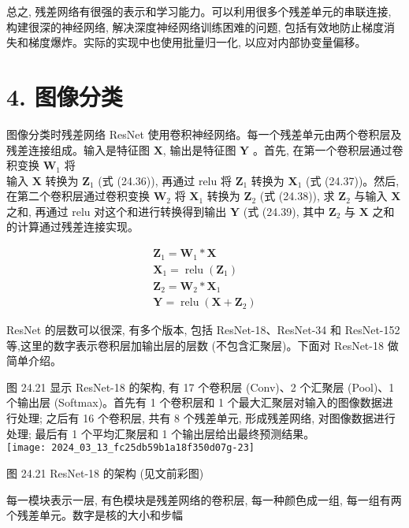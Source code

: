 \documentclass[10pt]{article}
\begin{document}
总之, 残差网络有很强的表示和学习能力。可以利用很多个残差单元的串联连接, 构建很深的神经网络, 解决深度神经网络训练困难的问题, 包括有效地防止梯度消失和梯度爆炸。实际的实现中也使用批量归一化, 以应对内部协变量偏移。

\section*{4. 图像分类}
图像分类时残差网络 ResNet 使用卷积神经网络。每一个残差单元由两个卷积层及残差连接组成。输入是特征图 $\boldsymbol{X}$, 输出是特征图 $\boldsymbol{Y}$ 。首先, 在第一个卷积层通过卷积变换 $\boldsymbol{W}_{1}$ 将\\
输入 $\boldsymbol{X}$ 转换为 $\boldsymbol{Z}_{1}$ (式 (24.36)), 再通过 relu 将 $\boldsymbol{Z}_{1}$ 转换为 $\boldsymbol{X}_{1}$ (式 (24.37))。然后, 在第二个卷积层通过卷积变换 $\boldsymbol{W}_{2}$ 将 $\boldsymbol{X}_{1}$ 转换为 $\boldsymbol{Z}_{2}$ (式 (24.38)), 求 $\boldsymbol{Z}_{2}$ 与输入 $\boldsymbol{X}$ 之和, 再通过 relu 对这个和进行转换得到输出 $\boldsymbol{Y}$ (式 (24.39), 其中 $\boldsymbol{Z}_{2}$ 与 $\boldsymbol{X}$ 之和的计算通过残差连接实现。


\begin{gather*}
\boldsymbol{Z}_{1}=\boldsymbol{W}_{1} * \boldsymbol{X}  \tag{24.36}\\
\boldsymbol{X}_{1}=\operatorname{relu}\left(\boldsymbol{Z}_{1}\right)  \tag{24.37}\\
\boldsymbol{Z}_{2}=\boldsymbol{W}_{2} * \boldsymbol{X}_{1}  \tag{24.38}\\
\boldsymbol{Y}=\operatorname{relu}\left(\boldsymbol{X}+\boldsymbol{Z}_{2}\right) \tag{24.39}
\end{gather*}


ResNet 的层数可以很深, 有多个版本, 包括 ResNet-18、ResNet-34 和 ResNet-152 等,这里的数字表示卷积层加输出层的层数 (不包含汇聚层)。下面对 ResNet-18 做简单介绍。

图 24.21 显示 ResNet-18 的架构, 有 17 个卷积层 (Conv)、2 个汇聚层 (Pool)、1 个输出层 (Softmax)。首先有 1 个卷积层和 1 个最大汇聚层对输入的图像数据进行处理; 之后有 16 个卷积层, 共有 8 个残差单元, 形成残差网络, 对图像数据进行处理; 最后有 1 个平均汇聚层和 1 个输出层给出最终预测结果。\\
\texttt{[image: 2024\_03\_13\_fc25db59b1a18f350d07g-23]}

图 24.21 ResNet-18 的架构 (见文前彩图)

每一模块表示一层, 有色模块是残差网络的卷积层, 每一种颜色成一组, 每一组有两个残差单元。数字是核的大小和步幅
\end{document}
